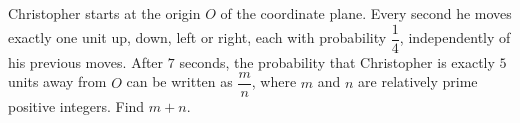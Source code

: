 Christopher starts at the origin $O$ of the coordinate plane. Every second he moves exactly one unit up, down, left or right, each with probability $\dfrac14$, independently of his previous moves. After $7$ seconds, the probability that Christopher is exactly $5$ units away from $O$ can be written as $\dfrac mn$, where $m$ and $n$ are relatively prime positive integers. Find $m+n$.
